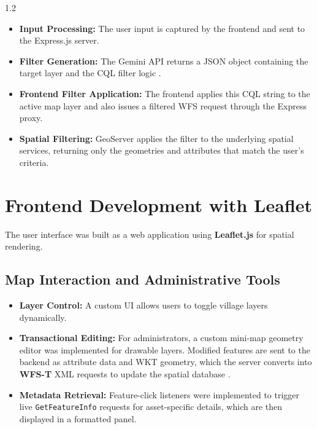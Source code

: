 \begin{spacing}{1.2}
\begin{itemize}
    \item \textbf{Input Processing:} The user input is captured by the frontend and sent to the Express.js server.
    \item \textbf{Filter Generation:} The Gemini API returns a JSON object containing the target layer and the CQL filter logic \cite{liu2025nalspatial}.
    \item \textbf{Frontend Filter Application:} The frontend applies this CQL string to the active map layer and also issues a filtered WFS request through the Express proxy.
    \item \textbf{Spatial Filtering:} GeoServer applies the filter to the underlying spatial services, returning only the geometries and attributes that match the user's criteria.
\end{itemize}

\section{Frontend Development with Leaflet}

The user interface was built as a web application using \textbf{Leaflet.js} for spatial rendering.

\subsection*{Map Interaction and Administrative Tools}

\begin{itemize}
    \item \textbf{Layer Control:} A custom UI allows users to toggle village layers dynamically.
    \item \textbf{Transactional Editing:} For administrators, a custom mini-map geometry editor was implemented for drawable layers. Modified features are sent to the backend as attribute data and WKT geometry, which the server converts into \textbf{WFS-T} XML requests to update the spatial database \cite{fu2020webgis, postgis_in_action}.
    \item \textbf{Metadata Retrieval:} Feature-click listeners were implemented to trigger live \texttt{GetFeatureInfo} requests for asset-specific details, which are then displayed in a formatted panel.
\end{itemize}

\end{spacing}
